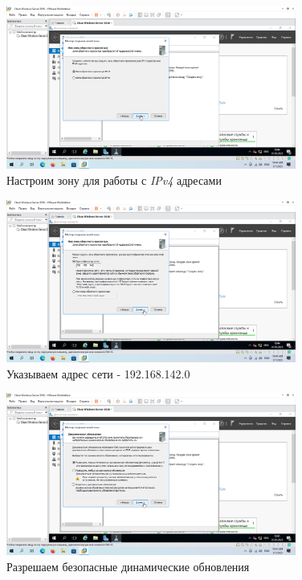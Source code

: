 \documentclass[a4paper]{article}
\begin{document}
  \begin{figure}[H]
    \centering
    \includegraphics[width=0.85\textwidth]{9_0081}
    \caption{Настроим зону для работы с \textit{IPv4} адресами}
    \label{img:0081}
  \end{figure}

  \begin{figure}[H]
    \centering
    \includegraphics[width=0.85\textwidth]{9_0082}
    \caption{Указываем адрес сети - 192.168.142.0}
    \label{img:0082}
  \end{figure}

  \begin{figure}[H]
    \centering
    \includegraphics[width=0.85\textwidth]{9_0083}
    \caption{Разрешаем безопасные динамические обновления}
    \label{img:0083}
  \end{figure}
\end{document}
